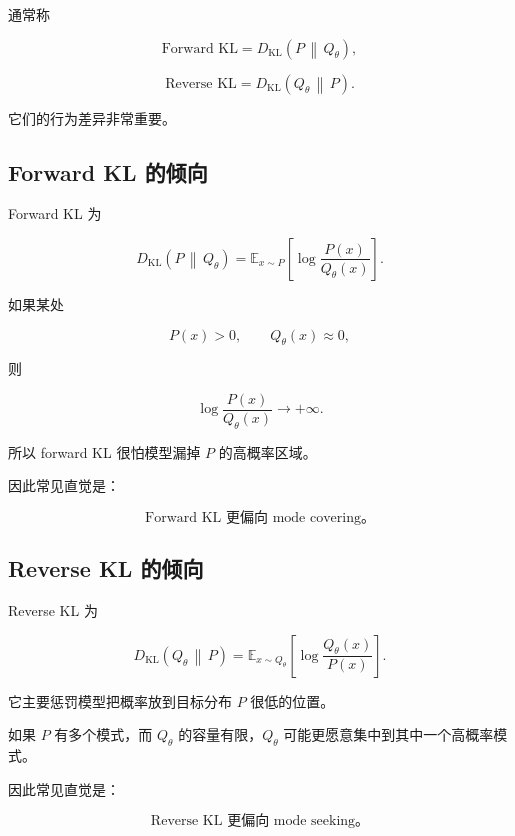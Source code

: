 \documentclass[11pt,a4paper]{ctexart}
\newcommand{\KL}[2]{D_{\mathrm{KL}}\!\left(#1\,\middle\|\,#2\right)}
\newcommand{\E}{\mathbb{E}}
\begin{document}
通常称

\begin{equation}
\text{Forward KL}
=
\KL{P}{Q_\theta},
\end{equation}

\begin{equation}
\text{Reverse KL}
=
\KL{Q_\theta}{P}.
\end{equation}

它们的行为差异非常重要。

\subsection{Forward KL 的倾向}

Forward KL 为

\[
\KL{P}{Q_\theta}
=
\E_{x\sim P}
\left[
\log\frac{P(x)}{Q_\theta(x)}
\right].
\]

如果某处

\[
P(x)>0,\qquad Q_\theta(x)\approx0,
\]

则

\[
\log\frac{P(x)}{Q_\theta(x)}
\rightarrow +\infty.
\]

所以 forward KL 很怕模型漏掉 $P$ 的高概率区域。

因此常见直觉是：

\[
\boxed{
\text{Forward KL 更偏向 mode covering。}
}
\]

\subsection{Reverse KL 的倾向}

Reverse KL 为

\[
\KL{Q_\theta}{P}
=
\E_{x\sim Q_\theta}
\left[
\log\frac{Q_\theta(x)}{P(x)}
\right].
\]

它主要惩罚模型把概率放到目标分布 $P$ 很低的位置。

如果 $P$ 有多个模式，而 $Q_\theta$ 的容量有限，$Q_\theta$ 可能更愿意集中到其中一个高概率模式。

因此常见直觉是：

\[
\boxed{
\text{Reverse KL 更偏向 mode seeking。}
}
\]
\end{document}
